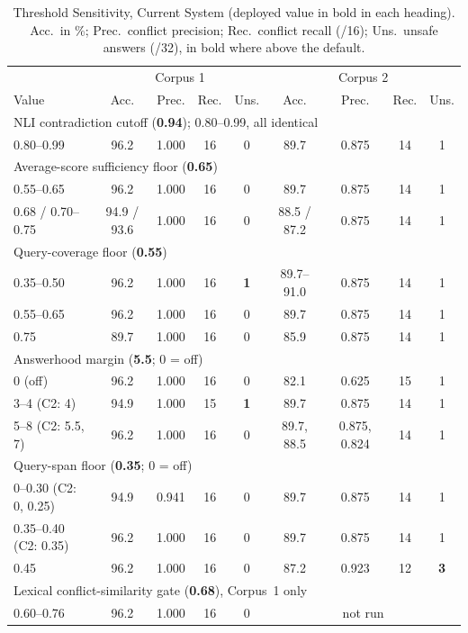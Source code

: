 \documentclass[conference]{IEEEtran}
\begin{document}
\begin{table}[t]
\caption{Threshold Sensitivity, Current System (deployed value in bold in
each heading). Acc.\ in \%; Prec.\ conflict precision; Rec.\ conflict
recall (/16); Uns.\ unsafe answers (/32), in bold where above the
default.}
\label{tab:sensitivity}
\centering
\small
\begin{tabular}{l c c c c c c c c}
\toprule
 & \multicolumn{4}{c}{Corpus 1} & \multicolumn{4}{c}{Corpus 2} \\
Value & Acc. & Prec. & Rec. & Uns. & Acc. & Prec. & Rec. & Uns. \\
\midrule
\multicolumn{9}{l}{NLI contradiction cutoff (\textbf{0.94}); 0.80--0.99, all identical} \\
0.80--0.99 & 96.2 & 1.000 & 16 & 0 & 89.7 & 0.875 & 14 & 1 \\
\multicolumn{9}{l}{Average-score sufficiency floor (\textbf{0.65})} \\
0.55--0.65 & 96.2 & 1.000 & 16 & 0 & 89.7 & 0.875 & 14 & 1 \\
0.68 / 0.70--0.75 & 94.9 / 93.6 & 1.000 & 16 & 0 & 88.5 / 87.2 & 0.875 & 14 & 1 \\
\multicolumn{9}{l}{Query-coverage floor (\textbf{0.55})} \\
0.35--0.50 & 96.2 & 1.000 & 16 & \textbf{1} & 89.7--91.0 & 0.875 & 14 & 1 \\
0.55--0.65 & 96.2 & 1.000 & 16 & 0 & 89.7 & 0.875 & 14 & 1 \\
0.75 & 89.7 & 1.000 & 16 & 0 & 85.9 & 0.875 & 14 & 1 \\
\multicolumn{9}{l}{Answerhood margin (\textbf{5.5}; 0 = off)} \\
0 (off) & 96.2 & 1.000 & 16 & 0 & 82.1 & 0.625 & 15 & 1 \\
3--4 (C2: 4) & 94.9 & 1.000 & 15 & \textbf{1} & 89.7 & 0.875 & 14 & 1 \\
5--8 (C2: 5.5, 7) & 96.2 & 1.000 & 16 & 0 & 89.7, 88.5 & 0.875, 0.824 & 14 & 1 \\
\multicolumn{9}{l}{Query-span floor (\textbf{0.35}; 0 = off)} \\
0--0.30 (C2: 0, 0.25) & 94.9 & 0.941 & 16 & 0 & 89.7 & 0.875 & 14 & 1 \\
0.35--0.40 (C2: 0.35) & 96.2 & 1.000 & 16 & 0 & 89.7 & 0.875 & 14 & 1 \\
0.45 & 96.2 & 1.000 & 16 & 0 & 87.2 & 0.923 & 12 & \textbf{3} \\
\multicolumn{9}{l}{Lexical conflict-similarity gate (\textbf{0.68}), Corpus~1 only} \\
0.60--0.76 & 96.2 & 1.000 & 16 & 0 & \multicolumn{4}{c}{not run} \\
\bottomrule
\end{tabular}
\end{table}
\end{document}
